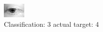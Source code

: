 \begin{figure}[h!]
\begin{center}
\includegraphics[width=0.60\columnwidth]{figures/ID2567_class_3_target_4.png}
\end{center}
\caption{ Classification: 3 actual target: 4}
\label{fig:ID2567_class_3_target_4}
\end{figure}
